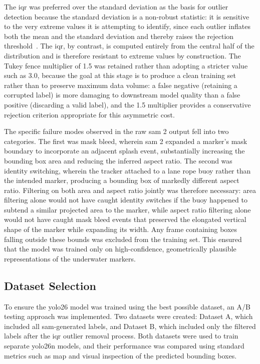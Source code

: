 The \gls{iqr} was preferred over the standard deviation as the basis for outlier detection because
the standard deviation is a non-robust statistic: it is sensitive to the very extreme values
it is attempting to identify, since each outlier inflates both the mean and the standard
deviation and thereby raises the rejection threshold~\cite{leys2013detecting}. The \gls{iqr}, by
contrast, is computed entirely from the central half of the distribution and is therefore
resistant to extreme values by construction. The Tukey fence multiplier of 1.5 was retained
rather than adopting a stricter value such as 3.0, because the goal at this stage is to
produce a clean training set rather than to preserve maximum data volume: a false negative
(retaining a corrupted label) is more damaging to downstream model quality than a false
positive (discarding a valid label), and the 1.5 multiplier provides a conservative rejection
criterion appropriate for this asymmetric cost.

The specific failure modes observed in the raw \gls{sam} 2 output fell into two categories.
The first was mask bleed, wherein \gls{sam} 2 expanded a marker's mask boundary to incorporate an
adjacent splash event, substantially increasing the bounding box area and reducing the
inferred aspect ratio. The second was identity switching, wherein the tracker attached to a
lane rope buoy rather than the intended marker, producing a bounding box of markedly different
aspect ratio. Filtering on both area and aspect ratio jointly was therefore necessary: area
filtering alone would not have caught identity switches if the buoy happened to subtend a
similar projected area to the marker, while aspect ratio filtering alone would not have caught
mask bleed events that preserved the elongated vertical shape of the marker while expanding its
width. Any frame containing boxes falling outside these bounds was excluded from the training
set. This ensured that the model was trained only on high-confidence, geometrically plausible
representations of the underwater markers.

\subsection{Dataset Selection}

To ensure the \gls{yolo26} model was trained using the best possible dataset, an A/B testing
approach was implemented. Two datasets were created: Dataset A, which included all
\gls{sam}-generated labels, and Dataset B, which included only the filtered labels after the \gls{iqr}
outlier removal process. Both datasets were used to train separate \gls{yolo26}n models, and their
performance was compared using standard metrics such as \gls{map} and visual
inspection of the predicted bounding boxes.

